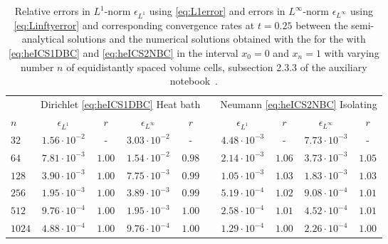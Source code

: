 \begin{table}[t]
	\centering
	\caption{\label{tab:HEconvergence}
		Relative errors in $L^1$-norm $\epsilon_{L^1}$ using \cref{eq:L1error} and errors in $L^\infty$-norm  $\epsilon_{L^\infty}$ using \cref{eq:Linftyerror} and corresponding convergence rates at $t=0.25$ between the semi-analytical solutions and the numerical solutions obtained with the \ktScheme{} for the \heq{} with \bcs{} \eqref{eq:heICS1DBC} and \eqref{eq:heICS2NBC} in the interval $x_0=0$ and $x_{n}=1$ with varying number $n$ of equidistantly spaced volume cells, \cf{} subsection 2.3.3 of the auxiliary notebook~\cite{Steil:2023PhDFVNB}.
	}
	\vspace{\TableAbovecaptionskip}
	\renewcommand{\arraystretch}{1.15}
	\small
	\begin{tabular}{l c c c c  p{0.2em}  c c c c}
		\toprule
		&	\multicolumn{4}{c}{Dirichlet \bc{} \eqref{eq:heICS1DBC} \dash{} Heat bath}							&						&	\multicolumn{4}{c}{Neumann \bc{} \eqref{eq:heICS2NBC} \dash{} Isolating}
		\\\cmidrule(lr){2-5}	\cmidrule(lr){7-10}
		$n$		&	$\epsilon_{L^1}$	&	$r$	&	$\epsilon_{L^\infty}$	&	$r$	&	&$\epsilon_{L^1}$	&	$r$	&	$\epsilon_{L^\infty}$	&	$r$	
		\\
		\midrule\addlinespace[0.25em]
			$32$	&	$1.56\cdot 10^{-2}$	&	-	&	$3.03\cdot 10^{-2}$	&	-	&		&	$4.48\cdot 10^{-3}$	&	-	&	$7.73\cdot 10^{-3}$	&	-\\
			$64$	&	$7.81\cdot 10^{-3}$	&	$1.00$	&	$1.54\cdot 10^{-2}$	&	$0.98$	&		&	$2.14\cdot 10^{-3}$	&	$1.06$	&	$3.73\cdot 10^{-3}$	&	$1.05$\\
			$128$	&	$3.90\cdot 10^{-3}$	&	$1.00$	&	$7.75\cdot 10^{-3}$	&	$0.99$	&		&	$1.05\cdot 10^{-3}$	&	$1.03$	&	$1.83\cdot 10^{-3}$	&	$1.03$\\
			$256$	&	$1.95\cdot 10^{-3}$	&	$1.00$	&	$3.89\cdot 10^{-3}$	&	$0.99$	&		&	$5.19\cdot 10^{-4}$	&	$1.02$	&	$9.08\cdot 10^{-4}$	&	$1.01$\\
			$512$	&	$9.76\cdot 10^{-4}$	&	$1.00$	&	$1.95\cdot 10^{-3}$	&	$1.00$	&		&	$2.58\cdot 10^{-4}$	&	$1.01$	&	$4.52\cdot 10^{-4}$	&	$1.01$\\
			$1024$	&	$4.88\cdot 10^{-4}$	&	$1.00$	&	$9.76\cdot 10^{-4}$	&	$1.00$	&		&	$1.29\cdot 10^{-4}$	&	$1.00$	&	$2.26\cdot 10^{-4}$	&	$1.00$\\
		\bottomrule
	\end{tabular}
\end{table}

